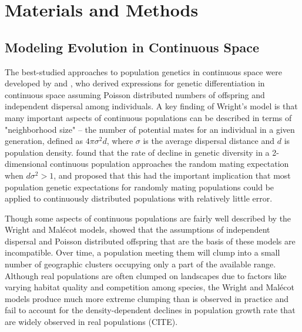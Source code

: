 \documentclass[10pt,twoside,lineno]{gsajnl}
\newif\ifcomments
\newcommand{\ak}[1]{\ifcomments{{\color{red} \it (#1)}}\else{}\fi}
\begin{document}
\section{Materials and Methods}
\label{sec:materials:methods}

\ak{i moved the following section into M\&M. makes more sense here i think}

\subsection{Modeling Evolution in Continuous Space}
The best-studied approaches to population genetics in continuous space were developed by \cite{Wright1943} and \cite{Malecot1948}, who derived expressions for genetic differentiation in continuous space assuming Poisson distributed numbers of offspring and independent dispersal among individuals. A key finding of Wright's model is that many important aspects of continuous populations can be described in terms of "neighborhood size" -- the number of potential mates for an individual in a given generation, defined as $4\pi\sigma^2d$, where $\sigma$ is the average dispersal distance and $d$ is population density. \cite{Maruyama1972} found that the rate of decline in genetic diversity in a 2-dimensional continuous population approaches the random mating expectation when $d\sigma^2 > 1$, and proposed that this had the important implication that most population genetic expectations for randomly mating populations could be applied to continuously distributed populations with relatively little error. 

Though some aspects of continuous populations are fairly well described by the Wright and Malécot models, \cite{Felsenstein1975} showed that the assumptions of independent dispersal and Poisson distributed offspring that are the basis of these models are incompatible. Over time, a population meeting them will clump into a small number of geographic clusters occupying only a part of the available range. Although real populations are often clumped on landscapes due to factors like varying habitat quality and competition among species, the Wright and Malécot models produce much more extreme clumping than is observed in practice and fail to account for the density-dependent declines in population growth rate that are widely observed in real populations (CITE). 
\end{document}
